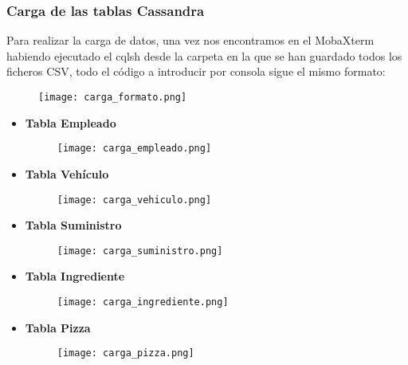 \documentclass[a4paper]{article}
\begin{document}
\subsubsection{\Large{Carga de las tablas Cassandra}}

Para realizar la carga de datos, una vez nos encontramos en el MobaXterm habiendo ejecutado el cqlsh desde la carpeta en la que se han guardado todos los ficheros CSV, todo el código a introducir por consola sigue el mismo formato:

\begin{figure}[H]
    \texttt{[image: carga\_formato.png]}
    \label{fig:carga_formato}
\end{figure}

\begin{itemize}

    \item \textbf{\large{Tabla Empleado}}
    
    \begin{figure}[H]
        \texttt{[image: carga\_empleado.png]}
        \label{fig:carga_empleado}
    \end{figure}
    
    \item \textbf{\large{Tabla Vehículo}}

    \begin{figure}[H]
        \texttt{[image: carga\_vehiculo.png]}
        \label{fig:carga_vehiculo}
    \end{figure}

    \item \textbf{\large{Tabla Suministro}}

    \begin{figure}[H]
        \texttt{[image: carga\_suministro.png]}
        \label{fig:carga_suministro}
    \end{figure}

    \item \textbf{\large{Tabla Ingrediente}}

    \begin{figure}[H]
        \texttt{[image: carga\_ingrediente.png]}
        \label{fig:carga_ingrediente}
    \end{figure}

    \item \textbf{\large{Tabla Pizza}}

    \begin{figure}[H]
        \texttt{[image: carga\_pizza.png]}
        \label{fig:carga_pizza}
    \end{figure}


\end{itemize}
\end{document}
